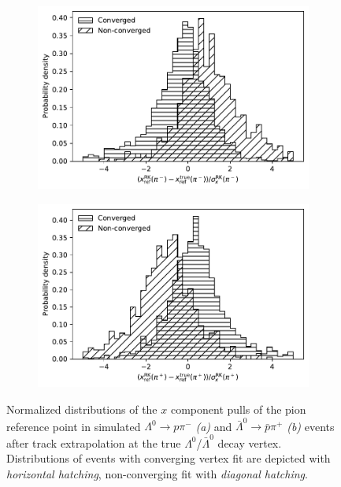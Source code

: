 \begin{figure}[t]
	\centering
	\begin{subfigure}{.45\textwidth}
		\includegraphics[width=\textwidth]{graphics/03-vertex_reconstruction/NONCONVERGED_pim_refpoint_residual_2Dv3D_x_rel_matter.pdf}
		\caption{}
		\label{fig:pim_refpoint_residual_2Dv3D_x_rel_matter}
	\end{subfigure}
	\begin{subfigure}{.45\textwidth}
		\includegraphics[width=\textwidth]{graphics/03-vertex_reconstruction/NONCONVERGED_pim_refpoint_residual_2Dv3D_x_rel_antimatter.pdf}
		\caption{}
		\label{fig:pim_refpoint_residual_2Dv3D_x_rel_antimatter}
	\end{subfigure}
	\caption{Normalized distributions of the $x$ component pulls of the pion reference point in simulated $\Lambda^0 \rightarrow p\pi^-$ \textit{(a)} and $\bar{\Lambda}^0 \rightarrow \bar{p}\pi^+$ \textit{(b)} events after track extrapolation at the true $\Lambda^0$/$\bar{\Lambda}^0$ decay vertex.
	Distributions of events with converging vertex fit are depicted with \textit{horizontal hatching}, non-converging fit with \textit{diagonal hatching}.}
	\label{fig:pim_refpoint_residual_2Dv3D_x_rel}
\end{figure}

